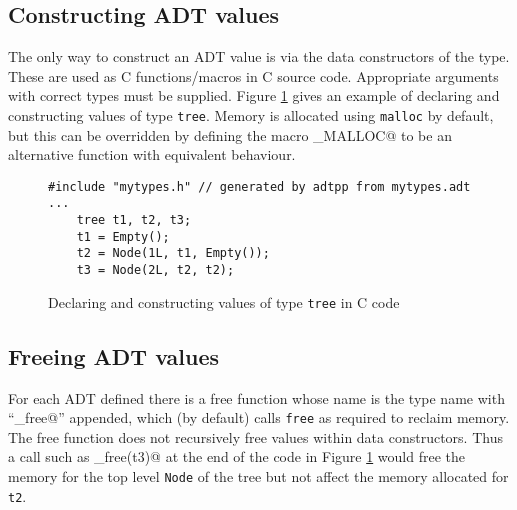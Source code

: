 \subsection{Constructing ADT values}


The only way to construct an ADT value is via the data constructors of
the type.
These are used as C functions/macros in C source code.  Appropriate
arguments with correct types must be supplied.  Figure \ref{fig:constr}
gives an example of declaring and constructing values of type
\texttt{tree}.
Memory is allocated using \texttt{malloc} by default, but this can be
overridden by defining the macro \verb@ADT_MALLOC@ to be an alternative
function with equivalent behaviour.


\begin{figure}[!ht]
\begin{verbatim}
#include "mytypes.h" // generated by adtpp from mytypes.adt
...
    tree t1, t2, t3;
    t1 = Empty();
    t2 = Node(1L, t1, Empty());
    t3 = Node(2L, t2, t2);
\end{verbatim}
\caption{Declaring and constructing values of type \texttt{tree} in C code}
\label{fig:constr}
\end{figure}

\subsection{Freeing ADT values}

For each ADT defined there is a free function whose name is the type
name with ``\verb@_free@'' appended, which (by default) calls
\texttt{free} as required to reclaim memory.  The free function does not
recursively free values within data constructors.  Thus a call such
as \verb@tree_free(t3)@ at the end of the code in Figure
\ref{fig:constr} would free the memory for the top level \texttt{Node}
of the tree but not affect the memory allocated for \texttt{t2}.

